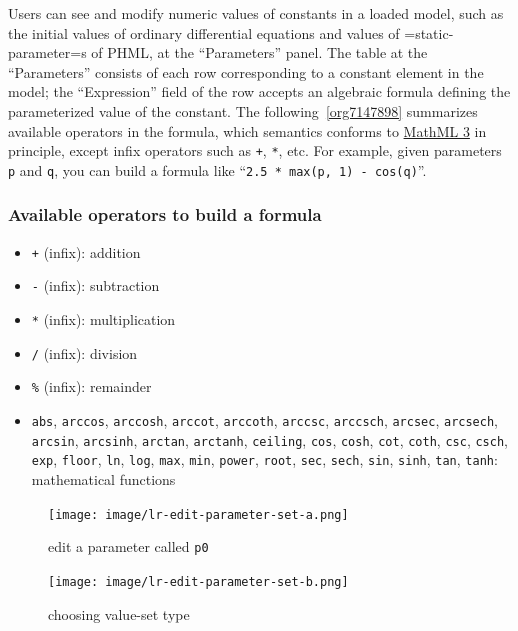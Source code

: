 \documentclass[a4paper,10pt]{report}
\begin{document}
Users can see and modify numeric values of constants in a loaded model,
such as the initial values of ordinary differential equations and values of
=static-parameter=s of PHML, at the ``Parameters'' panel.
The table at the ``Parameters'' consists of each row corresponding to a constant
element in the model; the ``Expression'' field of the row accepts an algebraic
formula defining the parameterized value of the constant.
The following~\ref{org7147898} summarizes available operators in
the formula, which semantics conforms to \href{https://www.w3.org/TR/MathML3/}{MathML 3} in principle,
except infix operators such as \texttt{+}, \texttt{*}, etc.
For example, given parameters \texttt{p} and \texttt{q}, you can build a formula
like ``\texttt{2.5 * max(p, 1) - cos(q)}''.

\subsubsection{\label{org7147898}Available operators to build a formula}
\label{sec:orgbea6c12}


\begin{itemize}
\item \texttt{+} (infix): addition
\item \texttt{-} (infix): subtraction
\item \texttt{*} (infix): multiplication
\item \texttt{/} (infix): division
\item \texttt{\%} (infix): remainder
\item \texttt{abs},
\texttt{arccos},
\texttt{arccosh},
\texttt{arccot},
\texttt{arccoth},
\texttt{arccsc},
\texttt{arccsch},
\texttt{arcsec},
\texttt{arcsech},
\texttt{arcsin},
\texttt{arcsinh},
\texttt{arctan},
\texttt{arctanh},
\texttt{ceiling},
\texttt{cos},
\texttt{cosh},
\texttt{cot},
\texttt{coth},
\texttt{csc},
\texttt{csch},
\texttt{exp},
\texttt{floor},
\texttt{ln},
\texttt{log},
\texttt{max},
\texttt{min},
\texttt{power},
\texttt{root},
\texttt{sec},
\texttt{sech},
\texttt{sin},
\texttt{sinh},
\texttt{tan},
\texttt{tanh}: mathematical functions
\end{itemize}

\begin{figure}[htbp]
\centering
\texttt{[image: image/lr-edit-parameter-set-a.png]}
\caption{\label{fig:orgeb11161}edit a parameter called \texttt{p0}}
\end{figure}
\begin{figure}[htbp]
\centering
\texttt{[image: image/lr-edit-parameter-set-b.png]}
\caption{\label{fig:org177130a}choosing value-set type}
\end{figure}
\end{document}

